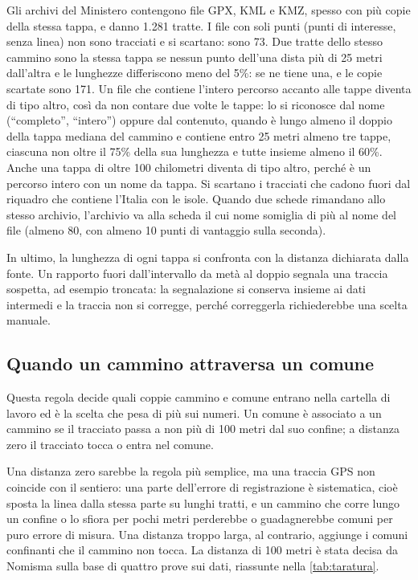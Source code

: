 Gli archivi del Ministero contengono file GPX, KML e KMZ, spesso con più copie della stessa tappa, e danno 1.281 tratte. I file con soli punti (punti di interesse, senza linea) non sono tracciati e si scartano: sono 73. Due tratte dello stesso cammino sono la stessa tappa se nessun punto dell'una dista più di 25 metri dall'altra e le lunghezze differiscono meno del 5\%: se ne tiene una, e le copie scartate sono 171. Un file che contiene l'intero percorso accanto alle tappe diventa di tipo altro, così da non contare due volte le tappe: lo si riconosce dal nome (“completo”, “intero”) oppure dal contenuto, quando è lungo almeno il doppio della tappa mediana del cammino e contiene entro 25 metri almeno tre tappe, ciascuna non oltre il 75\% della sua lunghezza e tutte insieme almeno il 60\%. Anche una tappa di oltre 100 chilometri diventa di tipo altro, perché è un percorso intero con un nome da tappa. Si scartano i tracciati che cadono fuori dal riquadro che contiene l'Italia con le isole. Quando due schede rimandano allo stesso archivio, l'archivio va alla scheda il cui nome somiglia di più al nome del file (almeno 80, con almeno 10 punti di vantaggio sulla seconda).

In ultimo, la lunghezza di ogni tappa si confronta con la distanza dichiarata dalla fonte. Un rapporto fuori dall'intervallo da metà al doppio segnala una traccia sospetta, ad esempio troncata: la segnalazione si conserva insieme ai dati intermedi e la traccia non si corregge, perché correggerla richiederebbe una scelta manuale.

\subsection{Quando un cammino attraversa un comune}\label{sec:attraversa}

Questa regola decide quali coppie cammino e comune entrano nella cartella di lavoro ed è la scelta che pesa di più sui numeri. Un comune è associato a un cammino se il tracciato passa a non più di 100 metri dal suo confine; a distanza zero il tracciato tocca o entra nel comune.

Una distanza zero sarebbe la regola più semplice, ma una traccia GPS non coincide con il sentiero: una parte dell'errore di registrazione è sistematica, cioè sposta la linea dalla stessa parte su lunghi tratti, e un cammino che corre lungo un confine o lo sfiora per pochi metri perderebbe o guadagnerebbe comuni per puro errore di misura. Una distanza troppo larga, al contrario, aggiunge i comuni confinanti che il cammino non tocca. La distanza di 100 metri è stata decisa da Nomisma sulla base di quattro prove sui dati, riassunte nella \cref{tab:taratura}.

